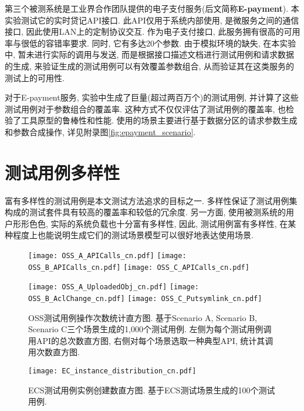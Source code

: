         第三个被测系统是工业界合作团队提供的电子支付服务(后文简称\textbf{E-payment}). 本实验测试它的实时贷记API接口. 此API仅用于系统内部使用, 是微服务之间的通信接口, 因此使用LAN上的定制协议交互. 作为电子支付接口, 此服务拥有很高的可用率与很低的容错率要求. 同时, 它有多达20个参数. 由于模拟环境的缺失, 在本实验中, 暂未进行实际的调用与发送, 而是根据接口描述文档进行测试用例和请求数据的生成, 来验证生成的测试用例可以有效覆盖参数组合, 从而验证其在这类服务的测试上的可用性.
        
        对于E-payment服务, 实验中生成了巨量(超过两百万个)的测试用例, 并计算了这些测试用例对于参数组合的覆盖率. 这种方式不仅仅评估了测试用例的覆盖率, 也检验了工具原型的鲁棒性和性能. 使用的场景主要进行基于数据分区的请求参数生成和参数合成操作, 详见附录图\ref{fig:epayment_scenario}.
        
    
    \section{测试用例多样性}
        富有多样性的测试用例是本文测试方法追求的目标之一. 多样性保证了测试用例集构成的测试套件具有较高的覆盖率和较低的冗余度. 另一方面, 使用被测系统的用户形形色色, 实际的系统负载也十分富有多样性, 因此, 测试用例富有多样性, 在某种程度上也能说明生成它们的测试场景模型可以很好地表达使用场景.
        
        \begin{figure}[!htb]
            \begin{minipage}{0.5\textwidth}
                \centering
                \texttt{[image: OSS\_A\_APICalls\_cn.pdf]}
                \texttt{[image: OSS\_B\_APICalls\_cn.pdf]}
                \texttt{[image: OSS\_C\_APICalls\_cn.pdf]}
            \end{minipage}
            \begin{minipage}{0.5\textwidth}
                \centering
                \texttt{[image: OSS\_A\_UploadedObj\_cn.pdf]}
                \texttt{[image: OSS\_B\_AclChange\_cn.pdf]}
                \texttt{[image: OSS\_C\_Putsymlink\_cn.pdf]}
            \end{minipage}
            \caption{OSS测试用例操作次数统计直方图. 基于Scenario A, Scenario B, Scenario C三个场景生成的1,000个测试用例. 左侧为每个测试用例调用API的总次数直方图, 右侧对每个场景选取一种典型API, 统计其调用次数直方图.}
            \label{fig:OSS_stat}
        \end{figure}
        
        \begin{figure}[!htb]
            \centering
            \texttt{[image: EC\_instance\_distribution\_cn.pdf]}
            \caption{ECS测试用例实例创建数直方图. 基于ECS测试场景生成的100个测试用例.}
            \label{fig:ECS_stat}
        \end{figure}
        
